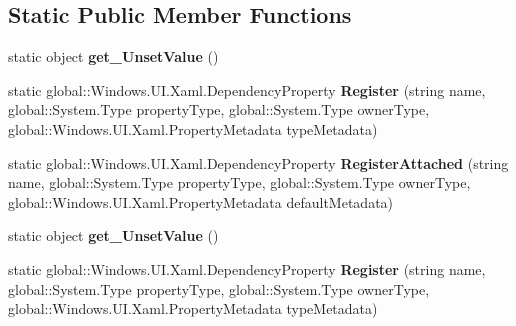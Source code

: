 \subsection*{Static Public Member Functions}
\begin{DoxyCompactItemize}
\item 
\mbox{\label{class_windows_1_1_u_i_1_1_xaml_1_1_dependency_property_a1c894733a17dba561f7ed84012ccd20f}} 
static object {\bfseries get\+\_\+\+Unset\+Value} ()
\item 
\mbox{\label{class_windows_1_1_u_i_1_1_xaml_1_1_dependency_property_afcde08990c00c5ed3c61a20868e08594}} 
static global\+::\+Windows.\+U\+I.\+Xaml.\+Dependency\+Property {\bfseries Register} (string name, global\+::\+System.\+Type property\+Type, global\+::\+System.\+Type owner\+Type, global\+::\+Windows.\+U\+I.\+Xaml.\+Property\+Metadata type\+Metadata)
\item 
\mbox{\label{class_windows_1_1_u_i_1_1_xaml_1_1_dependency_property_a6343063f73c71c10100255da1dcf03a2}} 
static global\+::\+Windows.\+U\+I.\+Xaml.\+Dependency\+Property {\bfseries Register\+Attached} (string name, global\+::\+System.\+Type property\+Type, global\+::\+System.\+Type owner\+Type, global\+::\+Windows.\+U\+I.\+Xaml.\+Property\+Metadata default\+Metadata)
\item 
\mbox{\label{class_windows_1_1_u_i_1_1_xaml_1_1_dependency_property_a1c894733a17dba561f7ed84012ccd20f}} 
static object {\bfseries get\+\_\+\+Unset\+Value} ()
\item 
\mbox{\label{class_windows_1_1_u_i_1_1_xaml_1_1_dependency_property_afcde08990c00c5ed3c61a20868e08594}} 
static global\+::\+Windows.\+U\+I.\+Xaml.\+Dependency\+Property {\bfseries Register} (string name, global\+::\+System.\+Type property\+Type, global\+::\+System.\+Type owner\+Type, global\+::\+Windows.\+U\+I.\+Xaml.\+Property\+Metadata type\+Metadata)
\item 
\mbox{\label{class_windows_1_1_u_i_1_1_xaml_1_1_dependency_property_a6343063f73c71c10100255da1dcf03a2}} 

\end{DoxyCompactItemize}
